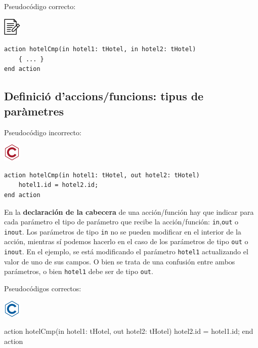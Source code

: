 \documentclass[
]{book}
\newenvironment{Shaded}{\begin{snugshade}}{\end{snugshade}}
\newcommand{\NormalTok}[1]{#1}
\begin{document}
Pseudocódigo correcto:

\includegraphics{./img/alg.png}

\begin{verbatim}
action hotelCmp(in hotel1: tHotel, in hotel2: tHotel)
    { ... }
end action
\end{verbatim}

\hypertarget{definiciuxf3-daccionsfuncions-tipus-de-paruxe0metres}{%
\subsection{Definició d'accions/funcions: tipus de paràmetres}\label{definiciuxf3-daccionsfuncions-tipus-de-paruxe0metres}}

Pseudocódigo incorrecto:

\includegraphics{./img/c_err.png}

\begin{verbatim}
action hotelCmp(in hotel1: tHotel, out hotel2: tHotel)
    hotel1.id = hotel2.id;
end action
\end{verbatim}

En la \textbf{declaración de la cabecera} de una acción/función hay que indicar para cada parámetro el tipo de parámetro que recibe la acción/función: \texttt{in},\texttt{out} o \texttt{inout}. Los parámetros de tipo \texttt{in} no se pueden modificar en el interior de la acción, mientras sí podemos hacerlo en el caso de los parámetros de tipo \texttt{out} o \texttt{inout}. En el ejemplo, se está modificando el parámetro \texttt{hotel1} actualizando el valor de uno de sus campos. O bien se trata de una confusión entre ambos parámetros, o bien \texttt{hotel1} debe ser de tipo \texttt{out}.

Pseudocódigos correctos:

\includegraphics{./img/c.png}

\begin{Shaded}
\begin{Highlighting}[]
\NormalTok{action hotelCmp(in hotel1: tHotel, out hotel2: tHotel)}
\NormalTok{    hotel2.id = hotel1.id;}
\NormalTok{end action}
\end{Highlighting}
\end{Shaded}
\end{document}

